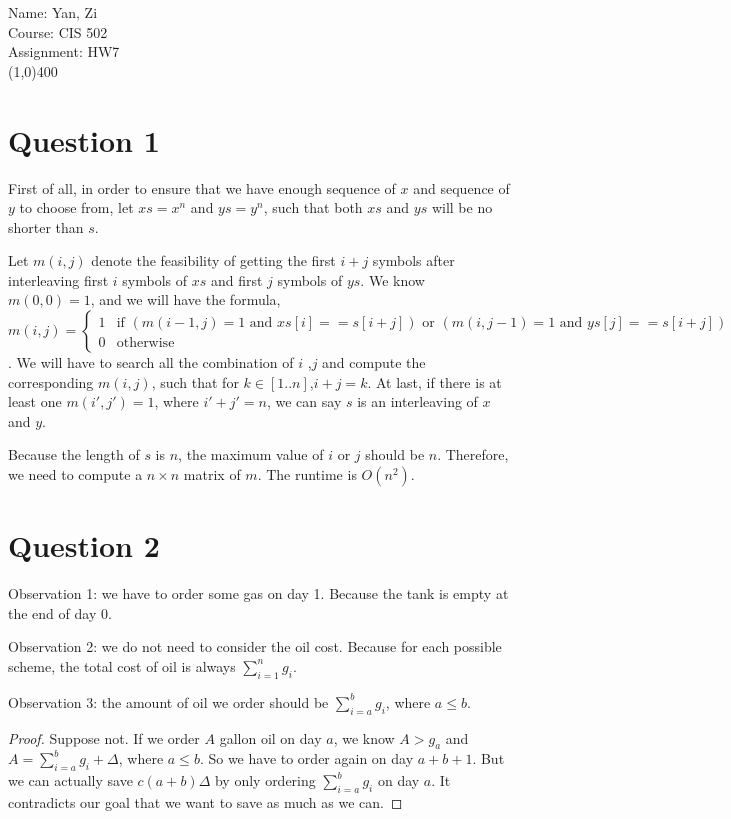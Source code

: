 \documentclass[letter,12pt]{article}
\begin{document}
Name: Yan, Zi \\
Course: CIS 502 \\
Assignment: HW7 \\
\line(1,0){400}
\section*{Question 1}
First of all, in order to ensure that we have enough sequence of $x$ and 
sequence of $y$ to choose from, let $xs = x^n$ and $ys = y^n$, such that both
$xs$ and $ys$ will be no shorter than $s$. 

Let $m(i, j)$ denote the feasibility of getting the first $i+j$ symbols after 
interleaving first $i$ symbols of $xs$ and first $j$ symbols of $ys$. We know 
$m(0, 0) = 1$, and we will have the formula, \\
$ m(i, j) = 
\begin{cases}
1 & \text{if } (m(i - 1, j) = 1 \text{ and } xs[i] == s[i + j]) \text{ or }  
                    (m(i, j -1) = 1 \text{ and } ys[j] == s[i + j]) \\
0 & \text{otherwise}
\end{cases}$. We will have to search all the combination of $i$ ,$j$ and 
compute the corresponding $m(i, j)$, such that for $k \in [1..n]$,$i+j=k$. 
At last, if there is at least one $m(i',j') = 1$, where $i'+j' = n$, we can say $s$
is an interleaving of $x$ and $y$.

Because the length of $s$ is $n$, the maximum value of $i$ or $j$ should be 
$n$. Therefore, we need to compute a $n\times n$ matrix of $m$. The runtime 
is $O(n^2)$.
\section*{Question 2}
Observation 1: we have to order some gas on day 1. Because the tank is empty
at the end of day 0.

Observation 2: we do not need to consider the oil cost. Because for each 
possible scheme, the total cost of oil is always $\sum\limits_{i=1}^n g_i$.

Observation 3: the amount of oil we order should be $\sum\limits_{i=a}^b g_i$,
where $a \le b$.
\begin{proof}
Suppose not. If we order $A$ gallon oil on day $a$, we know $A>g_a$ and 
$A= \sum\limits_{i=a}^b g_i + \Delta$, where $a \le b$. So we have to order
again on day $a+b+1$. But we can actually save $c(a+b)\Delta$ by only ordering
$\sum\limits_{i=a}^b g_i$ on day $a$. It contradicts our goal that we want to 
save as much as we can.
\end{proof}
\end{document}
